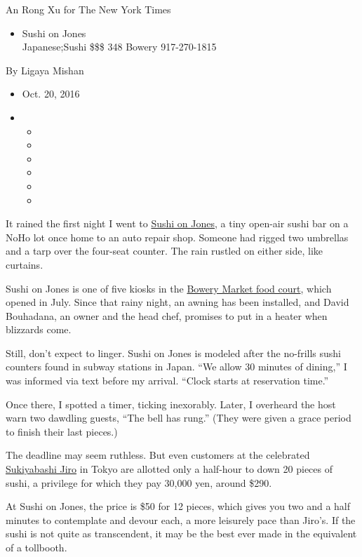 An Rong Xu for The New York Times

\begin{itemize}
\tightlist
\item
  Sushi on Jones\\
  Japanese;Sushi \$\$\$ 348 Bowery 917-270-1815
\end{itemize}

By Ligaya Mishan

\begin{itemize}
\item
  Oct. 20, 2016
\item
  \begin{itemize}
  \item
  \item
  \item
  \item
  \item
  \item
  \end{itemize}
\end{itemize}

It rained the first night I went to \href{http://sushionjones.com}{Sushi
on Jones}, a tiny open-air sushi bar on a NoHo lot once home to an auto
repair shop. Someone had rigged two umbrellas and a tarp over the
four-seat counter. The rain rustled on either side, like curtains.

Sushi on Jones is one of five kiosks in the
\href{http://www.thebowerymarket.com/}{Bowery Market food court}, which
opened in July. Since that rainy night, an awning has been installed,
and David Bouhadana, an owner and the head chef, promises to put in a
heater when blizzards come.

Still, don't expect to linger. Sushi on Jones is modeled after the
no-frills sushi counters found in subway stations in Japan. ``We allow
30 minutes of dining,'' I was informed via text before my arrival.
``Clock starts at reservation time.''

Once there, I spotted a timer, ticking inexorably. Later, I overheard
the host warn two dawdling guests, ``The bell has rung.'' (They were
given a grace period to finish their last pieces.)

The deadline may seem ruthless. But even customers at the celebrated
\href{http://www.sushi-jiro.jp/dining-at-jiro/}{Sukiyabashi Jiro} in
Tokyo are allotted only a half-hour to down 20 pieces of sushi, a
privilege for which they pay 30,000 yen, around \$290.

At Sushi on Jones, the price is \$50 for 12 pieces, which gives you two
and a half minutes to contemplate and devour each, a more leisurely pace
than Jiro's. If the sushi is not quite as transcendent, it may be the
best ever made in the equivalent of a tollbooth.

